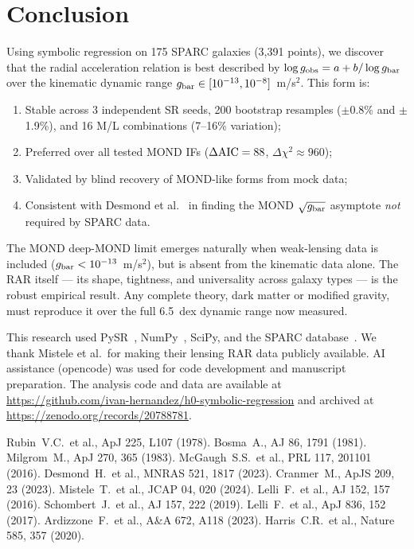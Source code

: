 \documentclass[twocolumn]{aastex631}
\begin{document}
\section{Conclusion}

Using symbolic regression on 175 SPARC galaxies (3,391 points), we discover
that the radial acceleration relation is best described
by $\log g_{\rm obs} = a + b/\log g_{\rm bar}$ over the kinematic dynamic
range $g_{\rm bar} \in [10^{-13}, 10^{-8}]$~m/s$^2$.  This form is:
\begin{enumerate}
\item Stable across 3 independent SR seeds, 200 bootstrap resamples
($\pm$0.8\% and $\pm$1.9\%), and 16 M/L combinations (7--16\% variation);
\item Preferred over all tested MOND IFs ($\Delta{\rm AIC}=88$, $\Delta\chi^2\approx960$);
\item Validated by blind recovery of MOND-like forms from mock data;
\item Consistent with Desmond et al.~\cite{desmond2023} in finding the
MOND $\sqrt{g_{\rm bar}}$ asymptote \emph{not} required by SPARC data.
\end{enumerate}

The MOND deep-MOND limit emerges naturally when weak-lensing data is
included ($g_{\rm bar} < 10^{-13}$~m/s$^2$), but is absent from the
kinematic data alone.  The RAR itself --- its shape, tightness, and
universality across galaxy types --- is the robust empirical result.
Any complete theory, dark matter or modified gravity, must reproduce
it over the full 6.5~dex dynamic range now measured.

\begin{acknowledgments}
This research used PySR~\cite{pysr}, NumPy~\cite{numpy}, SciPy, and the
SPARC database~\cite{lelli2016}.  We thank Mistele et al.\ for making their
lensing RAR data publicly available.  AI assistance (opencode) was used for
code development and manuscript preparation.  The analysis code and data are
available at \url{https://github.com/ivan-hernandez/h0-symbolic-regression}
and archived at \url{https://zenodo.org/records/20788781}.
\end{acknowledgments}

\begin{thebibliography}{}
 Rubin~V.C.\ et al., ApJ 225, L107 (1978).
 Bosma~A., AJ 86, 1791 (1981).
 Milgrom~M., ApJ 270, 365 (1983).
 McGaugh~S.S.\ et al., PRL 117, 201101 (2016).
 Desmond~H.\ et al., MNRAS 521, 1817 (2023).
 Cranmer~M., ApJS 209, 23 (2023).
 Mistele~T.\ et al., JCAP 04, 020 (2024).
 Lelli~F.\ et al., AJ 152, 157 (2016).
 Schombert~J.\ et al., AJ 157, 222 (2019).
 Lelli~F.\ et al., ApJ 836, 152 (2017).
 Ardizzone~F.\ et al., A\&A 672, A118 (2023).
 Harris~C.R.\ et al., Nature 585, 357 (2020).
\end{thebibliography}
\end{document}
